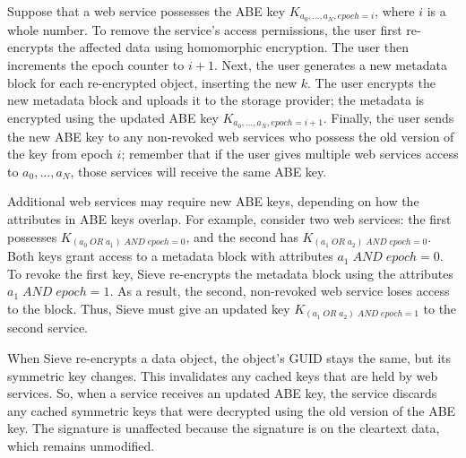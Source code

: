 Suppose that a web service possesses the ABE
key $K_{a_0,\ldots,a_N,epoch=i}$, where $i$ is a
whole number. To remove the service's access
permissions, the user first re-encrypts the
affected data using homomorphic encryption.
The user then increments the epoch counter to
$i+1$. Next, the user generates a new metadata
block for each re-encrypted object, inserting
the new $k$. The user encrypts the new metadata
block and uploads it to the storage provider;
the metadata is encrypted using the updated
ABE key $K_{a_0,\ldots,a_N,epoch=i+1}$. Finally, the
user sends the new ABE key to any non-revoked
web services who possess the old version of
the key from epoch $i$; remember that if the
user gives multiple web services access to
$a_0,\ldots,a_N$, those services will receive
the same ABE key.

Additional web services may require new ABE
keys, depending on how the attributes in ABE
keys overlap. For example, consider two web services:
the first possesses \allowbreak $K_{(a_0\; OR\; a_1)\; AND\; epoch=0}$,
and the second has $K_{(a_1\; OR\; a_2)\; AND\; epoch=0}$.
Both keys grant access to a metadata block
with attributes $a_1\; AND\; epoch=0$. To revoke
the first key, Sieve re-encrypts the metadata
block using the attributes $a_1\; AND\; epoch=1$.
As a result, the second, non-revoked web service
loses access to the block. Thus, Sieve must
give an updated key $K_{(a_1\; OR\; a_2)\; AND\; epoch=1}$
to the second service.

When Sieve re-encrypts a data object, the
object's GUID stays the same, but its symmetric
key changes. This invalidates any cached keys
that are held by web services. So, when a
service receives an updated ABE key, the
service discards any cached symmetric keys
that were decrypted using the old version
of the ABE key. The signature is unaffected
because the signature is on the cleartext data, which
remains unmodified.


